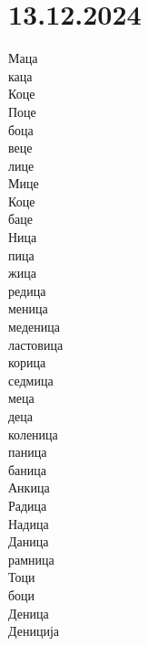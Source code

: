 \documentclass[a5paper,12pt]{article}
\newenvironment{activity}[1]{%
  \begin{tcolorbox}[colback=boxcolor,colframe=titlecolor,title={\textbf{#1}},fonttitle=\bfseries]
}{%
  \end{tcolorbox}
}
\begin{document}
\section{13.12.2024}
\begin{activity}{Зборчиња}
\begin{multicols}{4}
Маца\\ каца\\ Коце\\ Поце\\ боца\\ веце\\ лице\\ Мице\\ Коце\\ баце\\ Ница\\ пица\\ жица\\ редица\\ меница\\ меденица\\ ластовица\\ корица\\
седмица\\ меца\\ деца\\ коленица\\ паница\\ баница\\ Анкица\\ Радица\\ Надица\\ Даница\\ рамница\\ Тоци\\ боци\\ Деница\\ Дениција
\end{multicols}
\end{activity}
\end{document}
